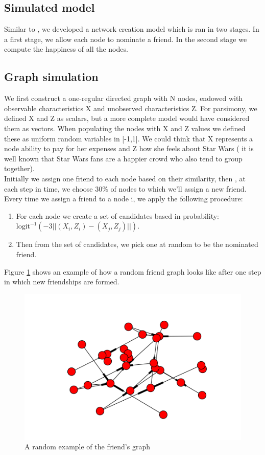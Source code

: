 \documentclass[11pt]{article}
\begin{document}
\subsection{Simulated model}

Similar to \cite{shalizi2011homophily}, we developed a network creation model which is ran in two stages. In a first stage, we allow each node to nominate a friend. In the second stage we compute the happiness of all the nodes.

\subsection{Graph simulation}

We first construct a one-regular directed graph with N nodes, endowed with observable characteristics X and unobserved characteristics Z. For parsimony, we defined X and Z as scalars, but a more complete model would have considered them as vectors. When populating the nodes with X and Z values we defined these as uniform random variables in [-1,1]. We could think that X represents a node ability to pay for her expenses and Z how she feels about Star Wars ( it is well known that Star Wars fans are a happier crowd who also tend to group together). \\

Initially we assign one friend to each node based on their similarity, then , at each step in time, we choose $30\%$ of nodes to which we'll assign a new friend. Every time we assign a friend to a node i, we apply the following procedure:

\begin{enumerate}
\item For each node we create a set of candidates based in probability: $\text{logit}^{-1} \left(-3||(X_i,Z_i)-(X_j,Z_j)||\right)$.
\item Then from the set of candidates, we pick one at random to be the nominated friend.
\end{enumerate}

Figure \ref{fig:graph} shows an example of how a random friend graph looks like after one step in which new friendships are formed.

\begin{figure}[h]
\centering
\includegraphics[scale=.3]{example_graph.png}
\caption{A random example of the friend's graph }
\label{fig:graph}
\end{figure}
\end{document}
